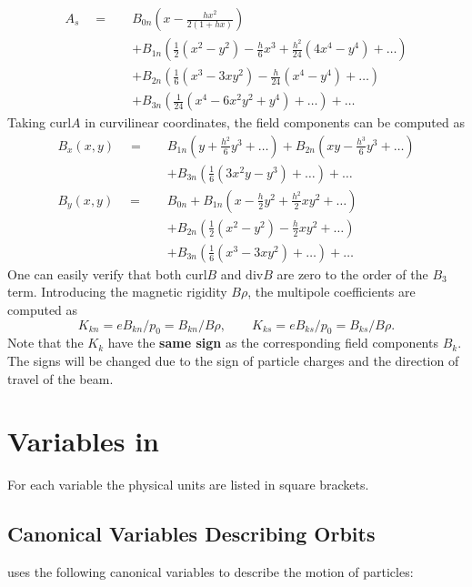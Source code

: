 \begin{align*}
  A_s \quad = \quad
  & B_{0n}\left(x-\frac{hx^2}{2(1+hx)}\right) \\
  &+B_{1n}\left(\frac{1}{2}(x^2-y^2)-\frac{h}{6}x^{3}
  +\frac{h^2}{24}(4x^{4}-y^{4})+\ldots\right) \\
  &+B_{2n}\left(\frac{1}{6}(x^{3}-3xy^2)-\frac{h}{24}(x^{4}-y^{4})
   +\ldots\right) \\
  &+B_{3n}\left(\frac{1}{24}(x^{4}-6x^2y^2+y^{4})+\ldots\right)
   + \ldots
\end{align*}
Taking $\mathrm{curl} A$ in curvilinear coordinates,
the field components can be computed as
\begin{align*}
  B_x(x,y) \quad = \quad
  & B_{1n}\left(y+\frac{h^2}{6}y^{3}+\ldots\right)
   +B_{2n}\left(xy-\frac{h^{3}}{6}y^{3}+\ldots\right) \\
  &+B_{3n}\left(\frac{1}{6}(3x^2y-y^{3})+\ldots\right) + \ldots \\
  B_y(x,y) \quad = \quad
  & B_{0n}
   +B_{1n}\left(x-\frac{h}{2}y^2+\frac{h^2}{2}xy^2+\ldots\right) \\
  &+B_{2n}\left(\frac{1}{2}(x^2-y^2)-\frac{h}{2}xy^2+\ldots\right) \\
  &+B_{3n}\left(\frac{1}{6}(x^{3}-3xy^2)+\ldots\right) + \ldots
\end{align*}
One can easily verify that both $\mathrm{curl} B$ and $\mathrm{div} B$
are zero to the order of the $B_3$ term.
Introducing the magnetic rigidity $B \rho$,
the multipole coefficients are computed as
\[
K_{kn}=eB_{kn}/p_0=B_{kn}/B\rho,\qquad
K_{ks}=eB_{ks}/p_0=B_{ks}/B\rho.
\]
Note that the $K_k$ have the \textbf{same sign} as the corresponding
field components $B_k$.
The signs will be changed due to the sign of particle charges and
the direction of travel of the beam.

\section{Variables in \opalmap}
\label{sec:variables}
For each variable the physical units are listed in square brackets.

\subsection{Canonical Variables Describing Orbits}
\label{sec:canon}
\opalmap uses the following canonical variables
to describe the motion of particles:

